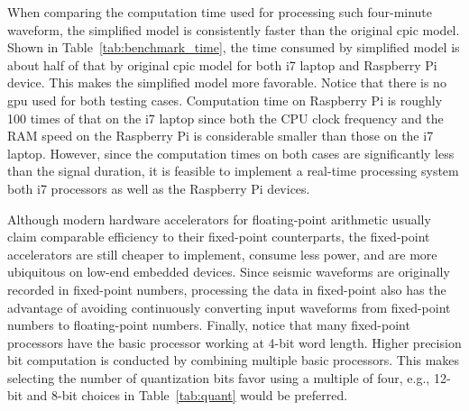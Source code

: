 \documentclass{article}
\begin{document}
When comparing the computation time used for processing such four-minute waveform, the simplified model is consistently faster than the original \gls{cpic} model.
Shown in Table~\ref{tab:benchmark_time}, the time consumed by simplified model is about half of that by original \gls{cpic} model for both i7 laptop and Raspberry Pi device.
This makes the simplified model more favorable.
Notice that there is no \gls{gpu} used for both testing cases.
Computation time on Raspberry Pi is roughly 100 times of that on the i7 laptop since both the CPU clock frequency and the RAM speed on the Raspberry Pi is considerable smaller than those on the i7 laptop.
However, since the computation times on both cases are significantly less than the signal duration, it is feasible to implement a real-time processing system both i7 processors as well as the Raspberry Pi devices.
%
\begin{table}
    \centering
    \caption{Benchmark of \gls{cpic} model computation times on Core i7 laptop vs.\ Raspberry Pi device processing a four-minute three-channel waveform from Mariana dataset.}
    \label{tab:benchmark_time}
\end{table}
%

Although modern hardware accelerators for floating-point arithmetic usually claim comparable efficiency to their fixed-point counterparts, the fixed-point accelerators are still cheaper to implement, consume less power, and are more ubiquitous on low-end embedded devices.
Since seismic waveforms are originally recorded in fixed-point numbers, processing the data in fixed-point also has the advantage of avoiding continuously converting input waveforms from fixed-point numbers to floating-point numbers.
Finally, notice that many fixed-point processors have the basic processor working at 4-bit word length.
Higher precision bit computation is conducted by combining multiple basic processors.
This makes selecting the number of quantization bits favor using a multiple of four, e.g., 12-bit and 8-bit choices in Table~\ref{tab:quant} would be preferred.



\begin{singlespace}  %
	\setlength\bibitemsep{\baselineskip}  %
	\printbibliography[title={References}]
\end{singlespace}
\end{document}
